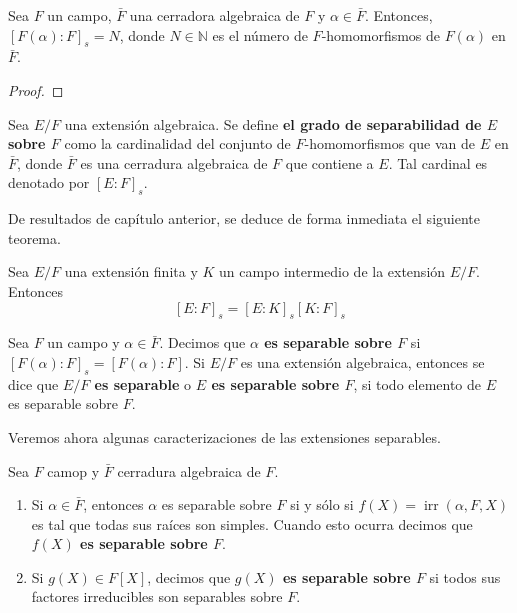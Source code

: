 \documentclass[12pt]{report}
\theoremstyle{largebreak}
\DeclareMathOperator{\irr}{irr}
\begin{document}
    \begin{propo}
        Sea $F$ un campo, $\bar{F}$ una cerradora algebraica de $F$ y $\alpha\in\bar{F}$. Entonces, $\left[F(\alpha):F\right]_s=N$, donde $N\in\mathbb{N}$ es el número de $F$-homomorfismos de $F(\alpha)$ en $\bar{F}$.
    \end{propo}
    
    \begin{proof}
        
    \end{proof}

    \begin{mydef}
        Sea $E/F$ una extensión algebraica. Se define \textbf{el grado de separabilidad de $E$ sobre $F$} como la cardinalidad del conjunto de $F$-homomorfismos que van de $E$ en $\bar{F}$, donde $\bar{F}$ es una cerradura algebraica de $F$ que contiene a $E$. Tal cardinal es denotado por $\left[E:F\right]_s$.
    \end{mydef}

    De resultados de capítulo anterior, se deduce de forma inmediata el siguiente teorema.

    \begin{theor}
        Sea $E/F$ una extensión finita y $K$ un campo intermedio de la extensión $E/F$. Entonces
        \begin{equation}
            \left[E:F\right]_s=\left[E:K\right]_s \left[K:F\right]_s
        \end{equation}
    \end{theor}

    \begin{mydef}
        Sea $F$ un campo y $\alpha\in\bar{F}$. Decimos que \textbf{$\alpha$ es separable sobre $F$} si $\left[F(\alpha):F\right]_s=\left[F(\alpha):F\right]$. Si $E/F$ es una extensión algebraica, entonces se dice que \textbf{$E/F$ es separable} o \textbf{$E$ es separable sobre $F$}, si todo elemento de $E$ es separable sobre $F$.
    \end{mydef}

    Veremos ahora algunas caracterizaciones de las extensiones separables.

    \begin{obs}
        Sea $F$ camop y $\bar{F}$ cerradura algebraica de $F$.
        \begin{enumerate}
            \item Si $\alpha\in\bar{F}$, entonces $\alpha$ es separable sobre $F$ si y sólo si $f(X)=\irr(\alpha, F, X)$ es tal que todas sus raíces son simples. Cuando esto ocurra decimos que \textbf{$f(X)$ es separable sobre $F$}.
            \item Si $g(X)\in F[X]$, decimos que \textbf{$g(X)$ es separable sobre $F$} si todos sus factores irreducibles son separables sobre $F$.
        \end{enumerate}
    \end{obs}
\end{document}
